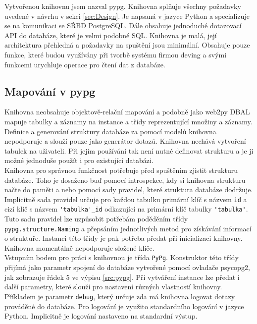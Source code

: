 \documentclass[ing,male,java,dept456]{diploma}						%
\begin{document}
Vytvořenou knihovnu jsem nazval pypg. Knihovna splňuje všechny požadavky uvedené v návrhu v sekci \ref{sec:Design}. Je napsaná v jazyce Python a specializuje se na komunikaci se SŘBD PostgreSQL. Dále obsahuje jednoduché dotazovací API do databáze, které je velmi podobné SQL. Knihovna je malá, její architektura přehledná a požadavky na spuštění jsou minimální. Obsahuje pouze funkce, které budou využívány při tvorbě systému firmou deving a svými funkcemi urychluje operace pro čtení dat z databáze. \\

\subsection{Mapování v pypg}

Knihovna neobsahuje objektově-relační mapování a podobně jako web2py DBAL mapuje tabulky a záznamy na instance a třídy reprezentující množiny a záznamy. \\
Definice a generování struktury databáze za pomocí modelů knihovna nepodporuje a slouží pouze jako generátor dotazů. Knihovna nechává vytvoření tabulek na uživateli. Při jejím používání tak není nutné definovat strukturu a je ji možné jednoduše použít i pro existující databázi. \\
Knihovna pro správnou funkčnost potřebuje před spuštěním zjistit strukturu databáze. Toho je dosaženo buď pomocí introspekce, kdy si knihovna strukturu načte do paměti a nebo pomocí sady pravidel, které struktura databáze dodržuje. Implicitně sada pravidel určuje pro každou tabulku primární klíč s názvem \lstinline[style=inlinepython]|id| a cizí klíč s názvem \lstinline[style=inlinepython]|'tabulka'_id| odkazující na primární klíč tabulky \lstinline[style=inlinepython]|'tabulka'|. Tuto sadu pravidel lze uzpůsobit potřebám poděděním třídy \lstinline[style=inlinepython]|pypg.structure.Naming| a přepsáním jednotlivých metod pro získávání informací o struktuře. Instanci této třídy je pak potřeba předat při inicializaci knihovny. Knihovna momentálně nepodporuje složené klíče. \\
Vstupním bodem pro práci s knihovnou je třída \lstinline[style=inlinepython]|PyPg|. Konstruktor této třídy přijímá jako parametr spojení do databáze vytvořené pomocí ovladače psycopg2, jak zobrazuje řádek 5 ve výpisu \ref{src:pypg}. Při vytváření instance lze předat i další parametry, které slouží pro nastavení různých vlastností knihovny. Příkladem je parametr \lstinline[style=inlinepython]|debug|, který určuje zda má knihovna logovat dotazy prováděné do databáze. Pro logování je využito standardního logování v jazyce Python. Implicitně je logování nastaveno na standardní výstup. \\ 
\end{document}
